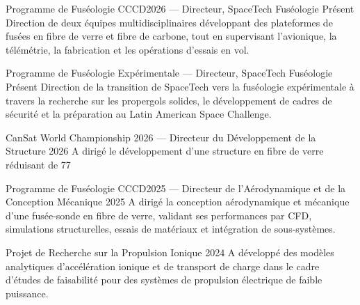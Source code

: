 \cvsection{\ProjectsLabel}

\cvproject
{Programme de Fuséologie CCCD2026 --- Directeur, SpaceTech Fuséologie}
{Présent}
{
Direction de deux équipes multidisciplinaires développant des plateformes de fusées en fibre de verre et fibre de carbone, tout en supervisant l'avionique, la télémétrie, la fabrication et les opérations d'essais en vol.
}

\cvproject
{Programme de Fuséologie Expérimentale --- Directeur, SpaceTech Fuséologie}
{Présent}
{
Direction de la transition de SpaceTech vers la fuséologie expérimentale à travers la recherche sur les propergols solides, le développement de cadres de sécurité et la préparation au Latin American Space Challenge.
}

\cvproject
{CanSat World Championship 2026 --- Directeur du Développement de la Structure}
{2026}
{
A dirigé le développement d'une structure en fibre de verre réduisant de 77%
}

\cvproject
{Programme de Fuséologie CCCD2025 --- Directeur de l'Aérodynamique et de la Conception Mécanique}
{2025}
{
A dirigé la conception aérodynamique et mécanique d'une fusée-sonde en fibre de verre, validant ses performances par CFD, simulations structurelles, essais de matériaux et intégration de sous-systèmes.
}

\cvproject
{Projet de Recherche sur la Propulsion Ionique}
{2024}
{
A développé des modèles analytiques d'accélération ionique et de transport de charge dans le cadre d'études de faisabilité pour des systèmes de propulsion électrique de faible puissance.
}
